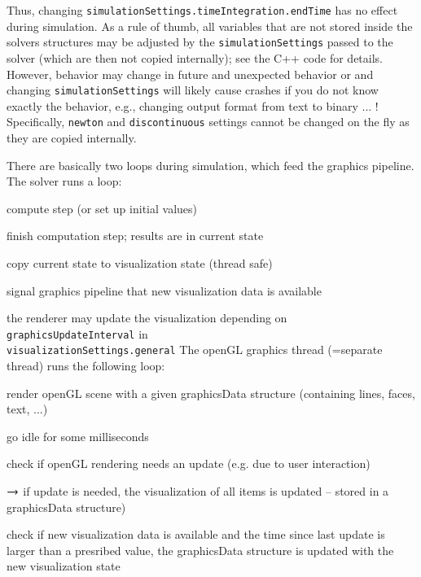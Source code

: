 Thus, changing \texttt{simulationSettings.timeIntegration.endTime} has no effect during simulation. 
As a rule of thumb, all variables that are not stored inside the solvers structures may be adjusted by the \texttt{simulationSettings} passed to the solver (which are then not copied internally); see the C++ code for details. However, behavior may change in future and unexpected behavior or and changing \texttt{simulationSettings} will likely cause crashes if you do not know exactly the behavior, e.g., changing output format from text to binary ... !
Specifically, \texttt{newton} and \texttt{discontinuous} settings cannot be changed on the fly as they are copied internally.

There are basically two loops during simulation, which feed the graphics pipeline.
The solver runs a loop:
\bi
  \item compute step (or set up initial values)
  \item finish computation step; results are in current state
  \item copy current state to visualization state (thread safe)
  \item signal graphics pipeline that new visualization data is available
  \item the renderer may update the visualization depending on \texttt{graphicsUpdateInterval} in \\ \texttt{visualizationSettings.general}
\ei
The openGL graphics thread (=separate thread) runs the following loop:
\bi
  \item render openGL scene with a given graphicsData structure (containing lines, faces, text, ...)
  \item go idle for some milliseconds
  \item check if openGL rendering needs an update (e.g. due to user interaction)
  \item[] $\rightarrow$ if update is needed, the visualization of all items is updated -- stored in a graphicsData structure)
  \item check if new visualization data is available and the time since last update is larger than a presribed value, the graphicsData structure is updated with the new visualization state
\ei

